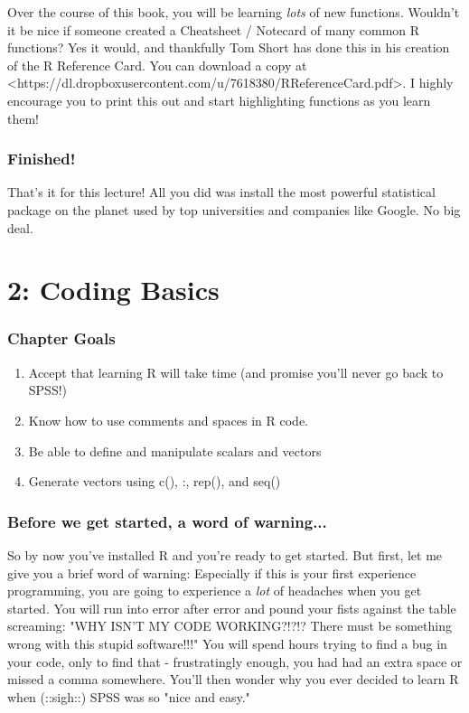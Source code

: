 \documentclass{tufte-book}\usepackage[]{graphicx}\usepackage[]{color}
\begin{document}
Over the course of this book, you will be learning \textit{lots} of new functions. Wouldn't it be nice if someone created a Cheatsheet / Notecard of many common R functions? Yes it would, and thankfully Tom Short has done this in his creation of the R Reference Card. You can download a copy at <https://dl.dropboxusercontent.com/u/7618380/RReferenceCard.pdf>. I highly encourage you to print this out and start highlighting functions as you learn them!


\subsection{Finished!}

That's it for this lecture! All you did was install the most powerful statistical package on the planet used by top universities and companies like Google. No big deal.


\chapter{2: Coding Basics}
\label{ch:2}


\subsection{Chapter Goals}

\begin{enumerate}
  \item Accept that learning R will take time (and promise you'll never go back to SPSS!)
  \item Know how to use comments and spaces in R code.
  \item Be able to define and manipulate scalars and vectors
  \item Generate vectors using c(), :, rep(), and seq()
\end{enumerate}


\subsection{Before we get started, a word of warning...}

So by now you've installed R and you're ready to get started. But first, let me give you a brief word of warning: Especially if this is your first experience programming, you are going to experience a \textit{lot} of headaches when you get started. You will run into error after error and pound your fists against the table screaming: "WHY ISN'T MY CODE WORKING?!?!? There must be something wrong with this stupid software!!!" You will spend hours trying to find a bug in your code, only to find that - frustratingly enough, you had had an extra space or missed a comma somewhere. You'll then wonder why you ever decided to learn R when (::sigh::) SPSS was so "nice and easy."
\end{document}
